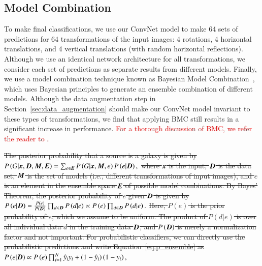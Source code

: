 \documentclass[fleqn,usenatbib]{mnras}
\newcommand{\ie}{{i.e., }}
\newcommand{\changed}[1]{\textcolor{red}{#1}}
\begin{document}
\subsection{Model Combination}
  \label{sec:bmc}

To make final classifications,
we use our ConvNet model to make 64 sets of predictions for
64 transformations of the input images:
4 rotations, 4 horizontal translations, and 4 vertical translations
(with random horizontal reflections).
Although we use an identical network architecture for all transformations,
we consider each set of predictions as separate results from different models.
Finally, we use a model combination technique known as
Bayesian Model Combination~\citep[BMC;][]{Monteith2011}, which
uses Bayesian principles to generate an ensemble combination of different models.
Although the data augmentation step in Section~\ref{sec:data_augmentation} should
make our ConvNet model invariant to these types of transformations,
we find that applying BMC still results in a significant increase in performance.
\changed{
For a thorough discussion of BMC, we refer the reader to \citet{Monteith2011}.
}

\sout{ The posterior probability that a source is a galaxy is given by }
\sout{ $ P \left(G | \bmath{x}, \bmath{D}, \bmath{M}, \bmath{E} \right) = \sum_{e \in \bmath{E}} P \left(G | \bmath{x}, \bmath{M}, e \right) P \left(e | \bmath{D} \right), $ }
\sout{ where $\bmath{x}$ is the input, $\bmath{D}$ is the data set, $\bmath{M}$ is the set of models (\ie different transformations of input images), and $e$ is an element in the ensemble space $\bmath{E}$ of possible model combinations.  By Bayes' Theorem, the posterior probability of $e$ given $\bmath{D}$ is given by }
\sout{$ P \left(e | \bmath{D} \right) = \frac{P \left(e \right)}{P \left(\bmath{D} \right)} \prod_{d \in \bmath{D}} P \left( d | e \right) \propto P \left(e\right) \prod_{d \in \bmath{D}} P \left(d | e \right). $}
\sout{Here, $P\left(e \right)$ is the prior probability of $e$, which we assume to be uniform.  The product of $P\left(d | e\right)$ is over all individual data $d$ in the training data $\bmath{D}$, and $P\left(\bmath{D}\right)$ is merely a normalization factor and not important.  For probabilistic classifiers, we can directly use the probabilistic predictions and write Equation~\ref{eq:p_ensemble} as}
\sout{ $ P \left( e | \bmath{D} \right) \propto P \left( e \right) \prod_{i=1}^{N} \hat{y}_i y_i + \left(1 - \hat{y}_i\right) \left(1 - y_i\right), $}
\end{document}
